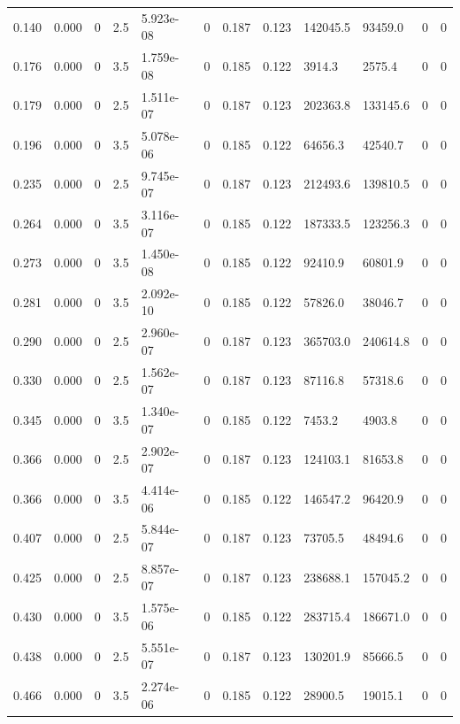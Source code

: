 \documentclass[preview]{standalone}
\begin{document}
{{\begin{tabular}{L{1.2cm}C{1.2cm} C{0.3cm}C{0.5cm} C{1.4cm}C{1.4cm} C{1.4cm}C{1.4cm} C{1.6cm}C{1.6cm} C{1.6cm}C{1.6cm}}
  0.140  &  0.000  & 0     & 2.5 &  5.923e-08  & 0  &  0.187&   0.123& 142045.5 & 93459.0   &  0 & 0  \\ 
  0.176  &  0.000  & 0     & 3.5 &  1.759e-08  & 0  &  0.185&   0.122& 3914.3 & 2575.4   &  0 & 0  \\ 
  0.179  &  0.000  & 0     & 2.5 &  1.511e-07  & 0  &  0.187&   0.123& 202363.8 & 133145.6   &  0 & 0  \\ 
  0.196  &  0.000  & 0     & 3.5 &  5.078e-06  & 0  &  0.185&   0.122& 64656.3 & 42540.7   &  0 & 0  \\ 
  0.235  &  0.000  & 0     & 2.5 &  9.745e-07  & 0  &  0.187&   0.123& 212493.6 & 139810.5   &  0 & 0  \\ 
  0.264  &  0.000  & 0     & 3.5 &  3.116e-07  & 0  &  0.185&   0.122& 187333.5 & 123256.3   &  0 & 0  \\ 
  0.273  &  0.000  & 0     & 3.5 &  1.450e-08  & 0  &  0.185&   0.122& 92410.9 & 60801.9   &  0 & 0  \\ 
  0.281  &  0.000  & 0     & 3.5 &  2.092e-10  & 0  &  0.185&   0.122& 57826.0 & 38046.7   &  0 & 0  \\ 
  0.290  &  0.000  & 0     & 2.5 &  2.960e-07  & 0  &  0.187&   0.123& 365703.0 & 240614.8   &  0 & 0  \\ 
  0.330  &  0.000  & 0     & 2.5 &  1.562e-07  & 0  &  0.187&   0.123& 87116.8 & 57318.6   &  0 & 0  \\ 
  0.345  &  0.000  & 0     & 3.5 &  1.340e-07  & 0  &  0.185&   0.122& 7453.2 & 4903.8   &  0 & 0  \\ 
  0.366  &  0.000  & 0     & 2.5 &  2.902e-07  & 0  &  0.187&   0.123& 124103.1 & 81653.8   &  0 & 0  \\ 
  0.366  &  0.000  & 0     & 3.5 &  4.414e-06  & 0  &  0.185&   0.122& 146547.2 & 96420.9   &  0 & 0  \\ 
  0.407  &  0.000  & 0     & 2.5 &  5.844e-07  & 0  &  0.187&   0.123& 73705.5 & 48494.6   &  0 & 0  \\ 
  0.425  &  0.000  & 0     & 2.5 &  8.857e-07  & 0  &  0.187&   0.123& 238688.1 & 157045.2   &  0 & 0  \\ 
  0.430  &  0.000  & 0     & 3.5 &  1.575e-06  & 0  &  0.185&   0.122& 283715.4 & 186671.0   &  0 & 0  \\ 
  0.438  &  0.000  & 0     & 2.5 &  5.551e-07  & 0  &  0.187&   0.123& 130201.9 & 85666.5   &  0 & 0  \\ 
  0.466  &  0.000  & 0     & 3.5 &  2.274e-06  & 0  &  0.185&   0.122& 28900.5 & 19015.1   &  0 & 0  \\ 

\end{tabular}}}
\end{document}
